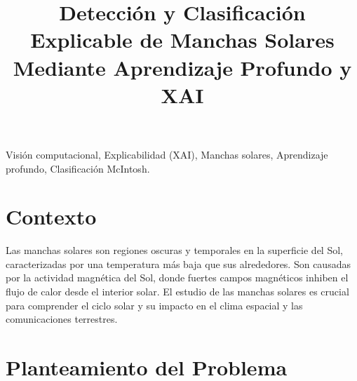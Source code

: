 \documentclass[conference]{IEEEtran}
\begin{document}
\title{Detección y Clasificación Explicable de Manchas Solares Mediante Aprendizaje Profundo y XAI}


\author{
}

\maketitle


\begin{IEEEkeywords}
    Visión computacional, Explicabilidad (XAI), Manchas solares, Aprendizaje profundo, Clasificación McIntosh.
\end{IEEEkeywords}



\section*{Contexto}
Las manchas solares son regiones oscuras y temporales en la superficie del Sol, caracterizadas por una temperatura más baja que sus alrededores. Son causadas por la actividad magnética del Sol, donde fuertes campos magnéticos inhiben el flujo de calor desde el interior solar. El estudio de las manchas solares es crucial para comprender el ciclo solar y su impacto en el clima espacial y las comunicaciones terrestres.

\section*{Planteamiento del Problema}
\end{document}
